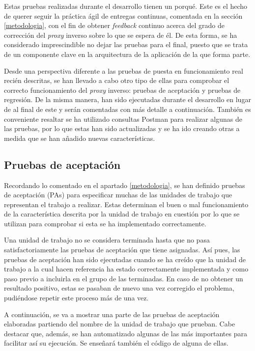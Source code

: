 \documentclass[11pt,spanish,listoffigures]{tfgetsinf}
\begin{document}
Estas pruebas realizadas durante el desarrollo tienen un porqué. Este es el hecho de querer seguir la práctica ágil de entregas continuas, comentada en la sección \ref{metodologia}, con el fin de obtener \emph{feedback} continuo acerca del grado de corrección del \emph{proxy} inverso sobre lo que se espera de él. De esta forma, se ha considerado imprescindible no dejar las pruebas para el final, puesto que se trata de un componente clave en la arquitectura de la aplicación de la que forma parte.

Desde una perspectiva diferente a las pruebas de puesta en funcionamiento real recién descritas, se han llevado a cabo otro tipo de ellas para comprobar el correcto funcionamiento del \emph{proxy} inverso: pruebas de aceptación y pruebas de regresión. De la misma manera, han sido ejecutadas durante el desarrollo en lugar de al final de este y serán comentadas con más detalle a continuación. También es conveniente resaltar se ha utilizado consultas Postman para realizar algunas de las pruebas, por lo que estas han sido actualizadas y se ha ido creando otras a medida que se han añadido nuevas características.


		\subsection{Pruebas de aceptación} \label{pruebasDeAceptacion}

Recordando lo comentado en el apartado \ref{metodologia}, se han definido pruebas de aceptación (PAs) para especificar muchas de las unidades de trabajo que representan el trabajo a realizar. Estas determinan el buen o mal funcionamiento de la característica descrita por la unidad de trabajo en cuestión por lo que se utilizan para comprobar si esta se ha implementado correctamente.

Una unidad de trabajo no se considera terminada hasta que no pasa satisfactoriamente las pruebas de aceptación que tiene asignadas. Así pues, las pruebas de aceptación han sido ejecutadas cuando se ha creído que la unidad de trabajo a la cual hacen referencia ha estado correctamente implementada y como paso previo a incluirla en el grupo de las terminadas. En caso de no obtener un resultado positivo, estas se pasaban de nuevo una vez corregido el problema, pudiéndose repetir este proceso más de una vez.

A continuación, se va a mostrar una parte de las pruebas de aceptación elaboradas partiendo del nombre de la unidad de trabajo que prueban. Cabe destacar que, además, se han automatizado algunas de las más importantes para facilitar así su ejecución. Se enseñará también el código de alguna de ellas.
\end{document}
